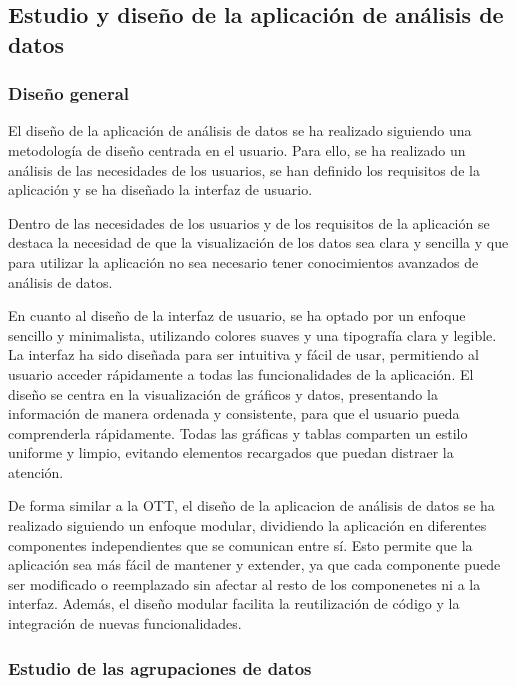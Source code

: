 \subsection{Estudio y diseño de la aplicación de análisis de datos}
\label{sec:diseno-estudio}

\subsubsection{Diseño general}
\label{sec:diseno-general}

El diseño de la aplicación de análisis de datos se ha realizado siguiendo una metodología de diseño centrada en el usuario. 
Para ello, se ha realizado un análisis de las necesidades de los usuarios, se han definido los requisitos de la aplicación 
y se ha diseñado la interfaz de usuario.

Dentro de las necesidades de los usuarios y de los requisitos de la aplicación se destaca la necesidad de que la visualización
de los datos sea clara y sencilla y que para utilizar la aplicación no sea necesario tener conocimientos avanzados de análisis de datos.

En cuanto al diseño de la interfaz de usuario, se ha optado por un enfoque sencillo y minimalista, utilizando colores suaves y 
una tipografía clara y legible. La interfaz ha sido diseñada para ser intuitiva y fácil de usar, permitiendo al usuario acceder 
rápidamente a todas las funcionalidades de la aplicación. El diseño se centra en la visualización de gráficos y datos, presentando 
la información de manera ordenada y consistente, para que el usuario pueda comprenderla rápidamente. Todas las gráficas y tablas 
comparten un estilo uniforme y limpio, evitando elementos recargados que puedan distraer la atención.

De forma similar a la OTT, el diseño de la aplicacion de análisis de datos se ha realizado siguiendo un enfoque modular,
dividiendo la aplicación en diferentes componentes independientes que se comunican entre sí. Esto permite que la aplicación sea
más fácil de mantener y extender, ya que cada componente puede ser modificado o reemplazado sin afectar al resto de los componenetes 
ni a la interfaz. Además, el diseño modular facilita la reutilización de código y la integración de nuevas funcionalidades.

\subsubsection{Estudio de las agrupaciones de datos}
\label{sec:diseno-agrupaciones}

